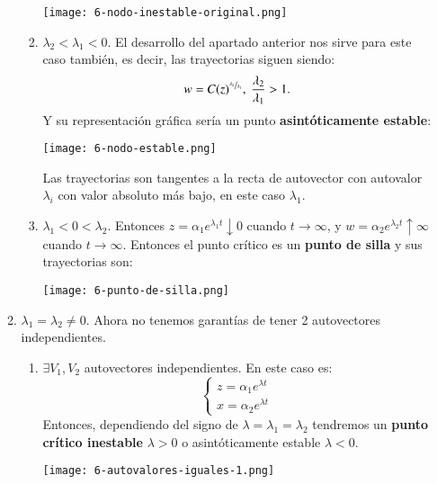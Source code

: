 \begin{enumerate}
\begin{enumerate}
\begin{enumerate}
            \begin{center}
                \texttt{[image: 6-nodo-inestable-original.png]}
            \end{center}
            \item $\lambda_2 < \lambda_1 < 0$.
            El desarrollo del apartado anterior nos sirve para este caso también, es decir, las trayectorias siguen siendo:
            $$
                w = C (z)^{\sfrac{\lambda_2}{\lambda_1}},\ \frac{\lambda_2}{\lambda_1} > 1.
            $$
            Y su representación gráfica sería un punto \textbf{asintóticamente estable}:
            \begin{center}
                \texttt{[image: 6-nodo-estable.png]}
            \end{center}
            Las trayectorias son tangentes a la recta de autovector con autovalor $\lambda_i$ con valor absoluto más bajo, en este caso $\lambda_1$.
            \item $\lambda_1 < 0 < \lambda_2$.
            Entonces $z = \alpha_1 e^{\lambda_1t} \downarrow 0$ cuando $t\to\infty$, y $w = \alpha_2 e^{\lambda_2t} \uparrow \infty$ cuando $t\to\infty$. Entonces el punto crítico es un \textbf{punto de silla} y sus trayectorias son:
            \begin{center}
                \texttt{[image: 6-punto-de-silla.png]}
            \end{center}
        \end{enumerate}
        \item $\lambda_1 = \lambda_2 \neq 0$.
        Ahora no tenemos garantías de tener 2 autovectores independientes.
        \begin{enumerate}
            \item $\exists V_1, V_2$ autovectores independientes. En este caso es:
            $$
            \begin{cases}
                z = \alpha_1 e^{\lambda t}\\
                x = \alpha_2 e^{\lambda t}
            \end{cases}
            $$
            Entonces, dependiendo del signo de $\lambda = \lambda_1 = \lambda_2$ tendremos un \textbf{punto crítico inestable} $\lambda > 0$ o asintóticamente estable $\lambda < 0$.
            \begin{center}
                \texttt{[image: 6-autovalores-iguales-1.png]}
            \end{center}

\end{enumerate}
\end{enumerate}
\end{enumerate}
